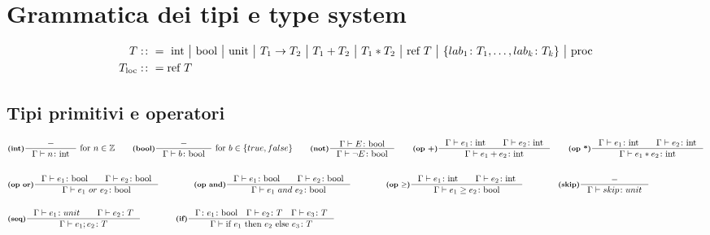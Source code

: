 \documentclass[a4paper, 10pt]{article}
\newcommand{\numberset}{\mathbb}
\newcommand{\Z}{\numberset{Z}}
\newcommand{\integer}{\textup{int}}
\newcommand{\bool}{\textup{bool}}
\theoremstyle{definition}
\newcommand{\infer}[4]{\inference[\textbf{#1}]{#2}{#3}#4 }
\begin{document}
\section*{Grammatica dei tipi e type system}
\vspace{-.5cm}
\begin{minipage}{.45\linewidth}
	\begin{flushleft}
	\begin{align*}
		T&:\colon=\ \integer\ \big|\ \bool\ \big|\ \textup{unit}\ \big|\ T_1\rightarrow T_2\ \big|\ T_1 + T_2\ \big|\ T_1 * T_2\ 
		\big|\ \textup{ref}\ T\ \big|\ \{lab_1\colon T_1, \dots, lab_k\colon T_k \}\ \big|\ \text{proc} \\
		T_{\text{loc}}&:\colon = \text{ref } T
	\end{align*}	
	\vspace{-1cm}
\subsection*{Tipi primitivi e operatori}
	\begin{align*}
		&\infer{(int)}{-}{\Gamma \vdash n\colon \integer}{\ \textup{for}\ n \in \Z} \qquad
		\infer{(bool)}{-}{\Gamma \vdash b\colon \bool}{\ \textup{for}\ b \in \{true, false\}} \qquad
		\infer{(not)}{\Gamma \vdash E\colon \bool}{\Gamma \vdash \neg E\colon \bool} \qquad
		\infer{(op +)}{\Gamma \vdash e_1\colon \integer\qquad \Gamma \vdash e_2\colon \integer}{\Gamma\vdash e_1 + e_2 \colon \integer}{}\qquad
		\infer{(op *)}{\Gamma \vdash e_1\colon \integer\qquad \Gamma \vdash e_2\colon \integer}{\Gamma\vdash e_1 * e_2 \colon \integer}{} \\ \\
		&\infer{(op or)}{\Gamma\vdash e_1\colon \bool\qquad \Gamma\vdash e_2\colon\bool}{\Gamma\vdash e_1\ or\ e_2 \colon\bool}{}\qquad\qquad
		\infer{(op and)}{\Gamma\vdash e_1\colon \bool\qquad \Gamma\vdash e_2\colon\bool}{\Gamma\vdash e_1\ and\ e_2 \colon\bool}{} \qquad\qquad
		\infer{(op $ \geq $)}{\Gamma \vdash e_1\colon \integer\qquad \Gamma \vdash e_2\colon \integer}{\Gamma\vdash e_1 \geq e_2 \colon \bool}{}\qquad\qquad
		\infer{(skip)}{-}{\Gamma\vdash skip\colon unit}{}\\ \\
		&\infer{(seq)}{\Gamma \vdash e_1\colon unit \qquad \Gamma\vdash e_2\colon T}{\Gamma \vdash e_1;e_2\colon T}{}\qquad\qquad
		\infer{(if)}{\Gamma\colon e_1\colon\bool\quad\Gamma\vdash e_2\colon T\quad \Gamma\vdash e_3 \colon T}{\Gamma\vdash \textup{if}\ e_1\ \textup{then}\ e_2\ \textup{else}\ e_3\colon T }{} \qquad\qquad

\end{align*}
\end{flushleft}
\end{minipage}
\end{document}
